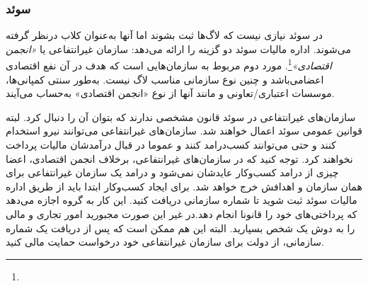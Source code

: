 \subsubsection{سوئد}
در سوئد نیازی نیست که لاگ‌ها ثبت بشوند اما آنها به‌عنوان کلاب
درنظر گرفته می‌شوند. اداره مالیات سوئد دو گزینه را ارائه می‌دهد:
سازمان غیرانتفاعی یا
\emph{«انجمن اقتصادی»}\footnote{}.
مورد دوم مربوط به سازمان‌هایی
است که هدف در آن نفع اقتصادی اعضامی‌باشد و چنین نوع سازمانی مناسب
لاگ نیست. به‌طور سنتی کمپانی‌ها، موسسات اعتباری/تعاونی و مانند آنها
از نوع «انجمن اقتصادی» به‌حساب می‌آیند.

سازمان‌های غیرانتفاعی در سوئد قانون مشخصی ندارند که بتوان آن را دنبال کرد.
لبته قوانین عمومی سوئد اعمال خواهند شد. سازمان‌های غیرانتفاعی می‌توانند نیرو
استخدام کنند و حتی می‌توانند کسب‌درامد کنند و عموما در قبال درآمدشان مالیات
پرداخت نخواهند کرد. توجه کنید که در سازمان‌های غیرانتفاعی، برخلاف انجمن اقتصادی،
اعضا چیزی از درامد کسب‌وکار عایدشان نمی‌شود و درامد یک سازمان غیرانتفاعی برای همان
سازمان و اهدافش خرج خواهد شد.
برای ایجاد کسب‌وکار ابتدا باید از طریق اداره مالیات سوئد ثبت شوید تا
شماره سازمانی دریافت کنید. این کار به گروه اجازه می‌دهد که پرداختی‌های خود را
قانونا انجام دهد.در غیر این صورت مجبورید امور تجاری و مالی را به دوش یک شخص
بسپارید.
البته این هم ممکن است که پس از دریافت یک شماره سازمانی، از دولت برای سازمان
غیرانتفاعی خود درخواست حمایت مالی کنید.

